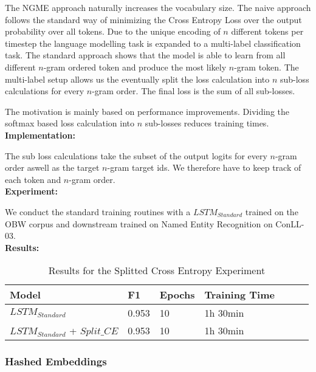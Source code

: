 \documentclass[11pt]{article}
\begin{document}
The NGME approach naturally increases the vocabulary size. The naive approach follows the standard
way of minimizing the Cross Entropy Loss over the output probability over all tokens. Due to
the unique encoding of $n$ different tokens per timestep the language modelling task is 
expanded to a multi-label classification task. The standard approach shows that the model 
is able to learn from all different $n$-gram ordered token and produce the most likely $n$-gram token.
The multi-label setup allows us the eventually split the loss calculation into $n$ sub-loss calculations
for every $n$-gram order. The final loss is the sum of all sub-losses.

The motivation is mainly based on performance improvements. Dividing the softmax based loss calculation 
into $n$ sub-losses reduces training times.\\

\textbf{Implementation:}

The sub loss calculations take the subset of the output logits for every $n$-gram order aswell as the target $n$-gram 
target ids. We therefore have to keep track of each token and $n$-gram order.\\

\textbf{Experiment:}

We conduct the standard training routines with a $LSTM_{Standard}$ trained on the OBW corpus and downstream trained 
on Named Entity Recognition on ConLL-03.\\

\textbf{Results:}
\begin{table}[h]
  \centering
  \begin{tabular}{|l|l|l|l|l|l|l|}
    \hline
    Model                           & F1    & Epochs & Training Time \\ \hline
    $LSTM_{Standard}$               & 0.953 & 10     & 1h 30min \\ \hline
    $LSTM_{Standard}$ + $Split\_CE$ & 0.953 & 10     & 1h 30min \\ \hline
  \end{tabular}
  \caption{Results for the Splitted Cross Entropy Experiment}
  \label{tab:hashed-embeddings-hyperparameters}
\end{table}



\subsubsection{Hashed Embeddings}
\end{document}
